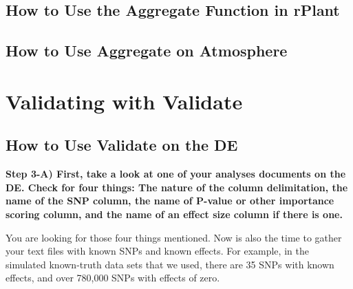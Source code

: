 \documentclass[twoside,a4paper]{refart}
\begin{document}
\begin{center}
\end{center}

\subsection{How to Use the Aggregate Function in rPlant}

\subsection{How to Use Aggregate on Atmosphere}

\section{Validating with Validate}

\subsection{How to Use Validate on the DE}

\textbf{Step 3-A) First, take a look at one of your analyses documents on the DE. Check for four things: The nature of the column delimitation, the name of the SNP column, the name of P-value or other importance scoring column, and the name of an effect size column if there is one.}

You are looking for those four things mentioned. Now is also the time to gather your text files with known SNPs and known effects. For example, in the simulated known-truth data sets that we used, there are 35 SNPs with known effects, and over 780,000 SNPs with effects of zero. 
\end{document}
